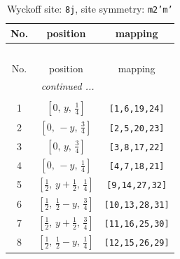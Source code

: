 \documentclass[fleqn,8pt]{jsarticle}
\begin{document}
\begin{longtable}{ccc}
\caption{Wyckoff site: {\tt 8j}, site symmetry: {\tt m2'm'}}
 \\
 \hline \hline
No. & position & mapping \\ \hline \endfirsthead

\multicolumn{2}{l}{\tablename\ \thetable{}} \\
 \hline \hline
No. & position & mapping \\ \hline \endhead

 \hline \hline
\multicolumn{2}{r}{\footnotesize\it continued ...} \\ \endfoot

 \hline \hline
\multicolumn{2}{r}{} \\ \endlastfoot

1 & $\left[ 0,\, y,\, \frac{1}{4} \right]$ & {\tt [1,6,19,24]} \\ \hline
2 & $\left[ 0,\, - y,\, \frac{3}{4} \right]$ & {\tt [2,5,20,23]} \\ \hline
3 & $\left[ 0,\, y,\, \frac{3}{4} \right]$ & {\tt [3,8,17,22]} \\ \hline
4 & $\left[ 0,\, - y,\, \frac{1}{4} \right]$ & {\tt [4,7,18,21]} \\ \hline
5 & $\left[ \frac{1}{2},\, y + \frac{1}{2},\, \frac{1}{4} \right]$ & {\tt [9,14,27,32]} \\ \hline
6 & $\left[ \frac{1}{2},\, \frac{1}{2} - y,\, \frac{3}{4} \right]$ & {\tt [10,13,28,31]} \\ \hline
7 & $\left[ \frac{1}{2},\, y + \frac{1}{2},\, \frac{3}{4} \right]$ & {\tt [11,16,25,30]} \\ \hline
8 & $\left[ \frac{1}{2},\, \frac{1}{2} - y,\, \frac{1}{4} \right]$ & {\tt [12,15,26,29]} \\
\end{longtable}
\renewcommand{\arraystretch}{1.2}
\end{document}
